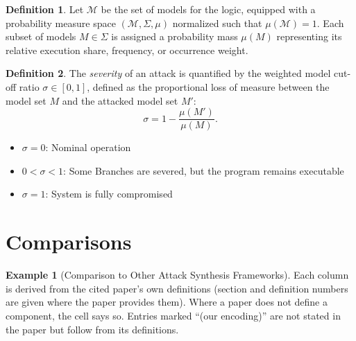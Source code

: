 \documentclass[11pt]{amsart}
\theoremstyle{definition}
\newtheorem{definition}{Definition}
\newtheorem{example}{Example}
\theoremstyle{remark}
\newcommand{\M}{\mathcal{M}}
\begin{document}
\begin{definition}
Let $\M$ be the set of models for the logic, equipped with a probability measure space $(\M, \Sigma, \mu)$
normalized such that $\mu(\M) = 1$. Each subset of models $M \in \Sigma$ is assigned a probability mass $\mu(M)$
representing its relative execution share, frequency, or occurrence weight.
\end{definition}

\begin{definition}
The \emph{severity} of an attack is quantified by the weighted model cut-off ratio $\sigma \in [0, 1]$, defined as the
proportional loss of measure between the model set $M$ and the attacked model set $M'$:
\[
  \sigma = 1 - \frac{\mu(M')}{\mu(M)}.
\]
\begin{itemize}
  \item $\sigma = 0$: Nominal operation
  \item $0 < \sigma < 1$: Some Branches are severed, but the program remains executable
  \item $\sigma = 1$: System is fully compromised
\end{itemize}
\end{definition}

\section{Comparisons}

\begin{example}[Comparison to Other Attack Synthesis Frameworks]
\label{ex:comparison}
Each column is derived from the cited paper's own definitions (section and definition numbers are given
where the paper provides them). Where a paper does not define a component, the cell says so. Entries
marked ``(our encoding)'' are not stated in the paper but follow from its definitions.
\end{example}
\end{document}
